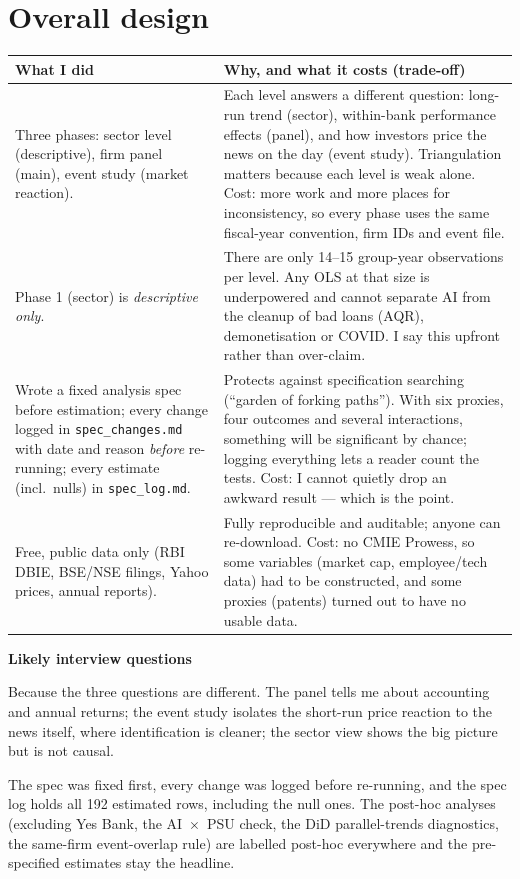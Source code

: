 \documentclass[10.5pt,a4paper]{article}
\newcommand{\var}[1]{\texttt{#1}}
\newenvironment{decisions}{%
  \begin{longtable}{L{0.36\textwidth} L{0.58\textwidth}}
  \toprule
  \textcolor{head}{\textbf{What I did}} & \textcolor{head}{\textbf{Why, and what it costs (trade-off)}}\\
  \midrule\endhead}{%
  \end{longtable}}
\newcommand{\row}[2]{#1 & #2\\ \midrule}
\newenvironment{qa}{\par\noindent\textcolor{qcol}{\textbf{Likely interview questions}}\begin{description}[font=\normalfont\itshape,leftmargin=0pt,style=nextline]}{\end{description}}
\newcommand{\q}[2]{\item[``#1'']#2}
\begin{document}
\section{Overall design}
\begin{decisions}
\row{Three phases: sector level (descriptive), firm panel (main), event study (market reaction).}
{Each level answers a different question: long-run trend (sector), within-bank performance effects (panel), and how
investors price the news on the day (event study). Triangulation matters because each level is weak alone. Cost: more
work and more places for inconsistency, so every phase uses the same fiscal-year convention, firm IDs and event file.}
\row{Phase 1 (sector) is \emph{descriptive only}.}
{There are only 14--15 group-year observations per level. Any OLS at that size is underpowered and cannot separate AI
from the cleanup of bad loans (AQR), demonetisation or COVID. I say this upfront rather than over-claim.}
\row{Wrote a fixed analysis spec before estimation; every change logged in \var{spec\_changes.md} with date and reason
\emph{before} re-running; every estimate (incl.\ nulls) in \var{spec\_log.md}.}
{Protects against specification searching (``garden of forking paths''). With six proxies, four outcomes and several
interactions, something will be significant by chance; logging everything lets a reader count the tests. Cost: I
cannot quietly drop an awkward result --- which is the point.}
\row{Free, public data only (RBI DBIE, BSE/NSE filings, Yahoo prices, annual reports).}
{Fully reproducible and auditable; anyone can re-download. Cost: no CMIE Prowess, so some variables (market cap,
employee/tech data) had to be constructed, and some proxies (patents) turned out to have no usable data.}
\end{decisions}
\begin{qa}
\q{Why not just run one regression?}{Because the three questions are different. The panel tells me about accounting
and annual returns; the event study isolates the short-run price reaction to the news itself, where identification is
cleaner; the sector view shows the big picture but is not causal.}
\q{How do you know you didn't p-hack?}{The spec was fixed first, every change was logged before re-running, and the
spec log holds all 192 estimated rows, including the null ones. The post-hoc analyses (excluding Yes Bank, the
AI~$\times$~PSU check, the DiD parallel-trends diagnostics, the same-firm event-overlap rule) are labelled post-hoc
everywhere and the pre-specified estimates stay the headline.}
\end{qa}
\end{document}
